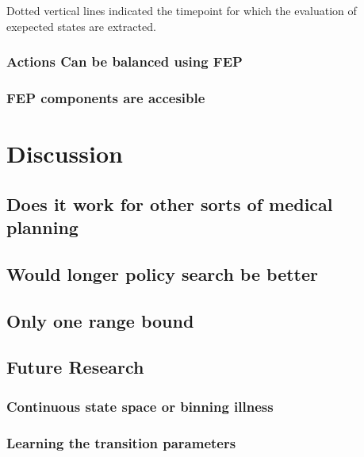 \documentclass[notspecified,article,submit,moreauthors,pdftex]{Definitions/mdpi}
\begin{document}
Dotted vertical lines indicated the timepoint for which the evaluation
of exepected states are extracted.

\subsubsection{Actions Can be balanced using
FEP}\label{actions-can-be-balanced-using-fep}

\subsubsection{FEP components are
accesible}\label{fep-components-are-accesible}

\section{Discussion}\label{discussion}

\subsection{Does it work for other sorts of medical
planning}\label{does-it-work-for-other-sorts-of-medical-planning}

\subsection{Would longer policy search be
better}\label{would-longer-policy-search-be-better}

\subsection{Only one range bound}\label{only-one-range-bound}

\subsection{Future Research}\label{future-research}

\subsubsection{Continuous state space or binning
illness}\label{continuous-state-space-or-binning-illness}

\subsubsection{Learning the transition
parameters}\label{learning-the-transition-parameters}
\end{document}

